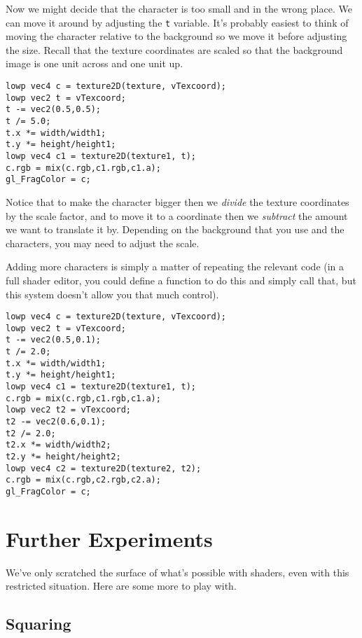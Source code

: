 \documentclass[
  html5,%
  mathml,%
  use filename%
]{internet}
\makeatletter
\let\prev@sec=\section
\renewcommand\section{\clearpage\prev@sec}
\makeatother
\begin{document}
Now we might decide that the character is too small and in the wrong place.
We can move it around by adjusting the \verb+t+ variable.
It's probably easiest to think of moving the character relative to the background so we move it before adjusting the size.
Recall that the texture coordinates are scaled so that the background image is one unit across and one unit up.

\begin{tcolorbox}
\begin{verbatim}
lowp vec4 c = texture2D(texture, vTexcoord);
lowp vec2 t = vTexcoord;
t -= vec2(0.5,0.5);
t /= 5.0;
t.x *= width/width1;
t.y *= height/height1;
lowp vec4 c1 = texture2D(texture1, t);
c.rgb = mix(c.rgb,c1.rgb,c1.a);
gl_FragColor = c;
\end{verbatim}
\end{tcolorbox}

Notice that to make the character bigger then we \emph{divide} the texture coordinates by the scale factor, and to move it to a coordinate then we \emph{subtract} the amount we want to translate it by.
Depending on the background that you use and the characters, you may need to adjust the scale.

Adding more characters is simply a matter of repeating the relevant code (in a full shader editor, you could define a function to do this and simply call that, but this system doesn't allow you that much control).

\begin{tcolorbox}
\begin{verbatim}
lowp vec4 c = texture2D(texture, vTexcoord);
lowp vec2 t = vTexcoord;
t -= vec2(0.5,0.1);
t /= 2.0;
t.x *= width/width1;
t.y *= height/height1;
lowp vec4 c1 = texture2D(texture1, t);
c.rgb = mix(c.rgb,c1.rgb,c1.a);
lowp vec2 t2 = vTexcoord;
t2 -= vec2(0.6,0.1);
t2 /= 2.0;
t2.x *= width/width2;
t2.y *= height/height2;
lowp vec4 c2 = texture2D(texture2, t2);
c.rgb = mix(c.rgb,c2.rgb,c2.a);
gl_FragColor = c;
\end{verbatim}
\end{tcolorbox}


\section{Further Experiments}

We've only scratched the surface of what's possible with shaders, even with this restricted situation.
Here are some more to play with.

\subsection{Squaring}
\end{document}
